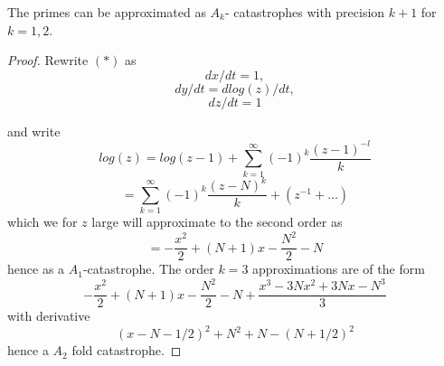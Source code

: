 \documentclass[10pt,a4paper]{amsart}
\begin{document}
\begin{theorem}
    The primes can be approximated as $A_k$- catastrophes with precision $k+1$ for $k=1, 2$.
\end{theorem}

\begin{proof}
    Rewrite $(\ast)$ as 
    $$dx/dt=1,$$
    $$dy/dt=dlog(z)/dt,$$
    $$dz/dt=1$$

and write
$$log(z)=log(z-1)+\sum_{k=1}^\infty (-1)^k \frac{(z-1)^{-l}}{k}$$
$$=\sum_{k=1}^\infty (-1)^k \frac{(z-N)^k}{k}+(z^{-1}+\dots)$$
which we for $z$ large will approximate to the second order as 
$$=-\frac{x^2}{2}+(N+1)x-\frac{N^2}{2}-N$$
hence as a $A_1$-catastrophe.
The order $k=3$ approximations are of the form 
    $$-\frac{x^2}{2}+(N+1)x-\frac{N^2}{2}-N+\frac{x^3-3Nx^2+3Nx-N^3}{3}$$
    with derivative
    $$(x-N-1/2)^2+N^2+N-(N+1/2)^2$$
    hence a $A_2$ fold catastrophe. 
\end{proof}
\end{document}
